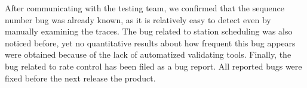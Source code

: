 After communicating with the testing team, we confirmed that the sequence number
bug was already known, as it is relatively easy to detect even by manually
examining the traces. The bug related to station scheduling was also noticed
before, yet no quantitative results about how frequent this bug appears were
obtained because of the lack of automatized validating tools. Finally, the bug
related to rate control has been filed as a bug report. All reported bugs were
fixed before the next release the product.

